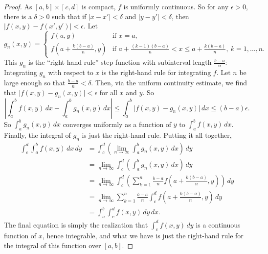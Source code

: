 \documentclass[12pt,openany]{book}
\newcommand{\sabs}[1]{\lvert {#1} \rvert}
\newcommand{\babs}[1]{\bigl\lvert {#1} \bigr\rvert}
\newcommand{\abs}[1]{\left\lvert {#1} \right\rvert}
\newcommand{\myquote}[1]{``#1''}
\theoremstyle{plain}
\theoremstyle{remark}
\theoremstyle{definition}
\theoremstyle{exercise}
\theoremstyle{example}
\begin{document}
\begin{proof}
As $[a,b] \times [c,d]$ is compact, $f$ is uniformly continuous.
So for
any $\epsilon > 0$, there is a $\delta > 0$ such that if
$\sabs{x-x'} < \delta$ and 
$\sabs{y-y'} < \delta$, then $\sabs{f(x,y) -f(x',y')} < \epsilon$.
Let
\begin{equation*}
g_n(x,y)
=
\begin{cases}
f(a,y) & \text{if } x=a ,
\\
f\left(a+\frac{k(b-a)}{n},y\right)
& \text{if } a+\frac{(k-1)(b-a)}{n} < x \leq a+\frac{k(b-a)}{n} , ~
k=1,\ldots,n.
\end{cases}
\end{equation*}
This $g_n$ is the \myquote{right-hand rule} step function with
subinterval length $\frac{b-a}{n}$:
Integrating $g_n$ with respect to $x$ is the right-hand rule for integrating $f$.
Let $n$ be large enough so that $\frac{b-a}{n} < \delta$.  Then,
via the uniform continuity estimate, we find that $\babs{f(x,y)-g_n(x,y)} < \epsilon$
for all $x$ and $y$. So
\begin{equation*}
\abs{
\int_a^b
f(x,y)
\, dx
-
\int_a^b
g_n(x,y)
\, dx
}
\leq
\int_a^b
\babs{
f(x,y)
-
g_n(x,y)
}
\, dx
\leq (b-a)\epsilon .
\end{equation*}
So $\int_a^b g_n(x,y) \, dx$ converges uniformly as a function of $y$ to
$\int_a^b f(x,y) \, dx$.  Finally, the integral of $g_n$ is just the
right-hand rule.  Putting it all together,
\begin{equation*}
\begin{split}
\int_c^d \int_a^b f(x,y) \, dx \, dy
& =
\int_c^d
\left(
\lim_{n \to \infty}
\int_a^b g_n(x,y) \, dx
\right) \, dy
\\
& =
\lim_{n \to \infty}
\int_c^d
\left(
\int_a^b g_n(x,y) \, dx
\right) \, dy
\\
& =
\lim_{n \to \infty}
\int_c^d
\left(
\sum_{k=1}^n
\frac{b-a}{n} f\left(a+\frac{k(b-a)}{n},y\right)
\right) \, dy
\\
& =
\lim_{n \to \infty}
\sum_{k=1}^n
\frac{b-a}{n} 
\int_c^d
f\left(a+\frac{k(b-a)}{n},y\right)
\, dy
\\
& =
\int_a^b
\int_c^d
f(x,y)
\, dy \, dx .
\end{split}
\end{equation*}
The final equation is simply the realization that  
$\int_c^d
f(x,y)
\, dy$ is a continuous function of $x$, hence integrable, and what we have
is just the right-hand rule for the integral of this function over $[a,b]$.
\end{proof}
\end{document}
